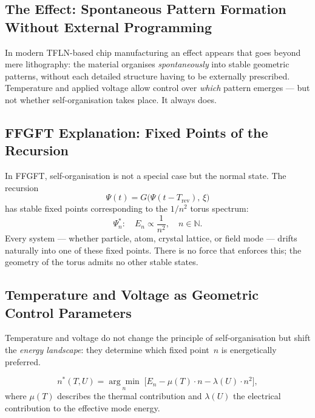 \subsection{The Effect: Spontaneous Pattern Formation Without External Programming}

In modern TFLN-based chip manufacturing an effect appears that goes
beyond mere lithography: the material organises \emph{spontaneously}
into stable geometric patterns, without each detailed structure having
to be externally prescribed. Temperature and applied voltage allow
control over \emph{which} pattern emerges — but not whether
self-organisation takes place. It always does.

\subsection{FFGFT Explanation: Fixed Points of the Recursion}

In FFGFT, self-organisation is not a special case but the normal state.
The recursion
\begin{equation}
  \Psi(t) = G\!\bigl(\Psi(t - T_{\text{rev}}),\, \xi\bigr)
\end{equation}
has stable fixed points corresponding to the $1/n^2$ torus spectrum:
\begin{equation}
  \Psi_n^* : \quad E_n \propto \frac{1}{n^2}, \quad n \in \mathbb{N}.
\end{equation}
Every system — whether particle, atom, crystal lattice, or field mode —
drifts naturally into one of these fixed points. There is no force
that enforces this; the geometry of the torus admits no other stable
states.

\subsection{Temperature and Voltage as Geometric Control Parameters}

Temperature and voltage do not change the principle of self-organisation
but shift the \emph{energy landscape}: they determine which fixed
point~$n$ is energetically preferred.

\begin{equation}
  n^*(T, U) = \underset{n}{\arg\min}\;
    \bigl[ E_n - \mu(T)\cdot n - \lambda(U)\cdot n^2 \bigr],
\end{equation}
where $\mu(T)$ describes the thermal contribution and $\lambda(U)$ the
electrical contribution to the effective mode energy.

